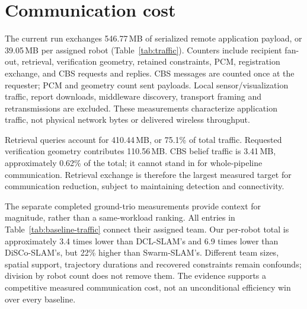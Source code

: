 \section{Communication cost}
\label{sec:communication}
The current run exchanges 546.77\,MB of serialized remote application payload, or 39.05\,MB per assigned robot (Table~\ref{tab:traffic}). Counters include recipient fan-out, retrieval, verification geometry, retained constraints, PCM, registration exchange, and CBS requests and replies. CBS messages are counted once at the requester; PCM and geometry count sent payloads. Local sensor/visualization traffic, report downloads, middleware discovery, transport framing and retransmissions are excluded. These measurements characterize application traffic, not physical network bytes or delivered wireless throughput.


Retrieval queries account for 410.44\,MB, or 75.1\% of total traffic. Requested verification geometry contributes 110.56\,MB. CBS belief traffic is 3.41\,MB, approximately 0.62\% of the total; it cannot stand in for whole-pipeline communication. Retrieval exchange is therefore the largest measured target for communication reduction, subject to maintaining detection and connectivity.


The separate completed ground-trio measurements provide context for magnitude, rather than a same-workload ranking. All entries in Table~\ref{tab:baseline-traffic} connect their assigned team. Our per-robot total is approximately 3.4 times lower than DCL-SLAM's and 6.9 times lower than DiSCo-SLAM's, but 22\% higher than Swarm-SLAM's. Different team sizes, spatial support, trajectory durations and recovered constraints remain confounds; division by robot count does not remove them. The evidence supports a competitive measured communication cost, not an unconditional efficiency win over every baseline.
\FloatBarrier
